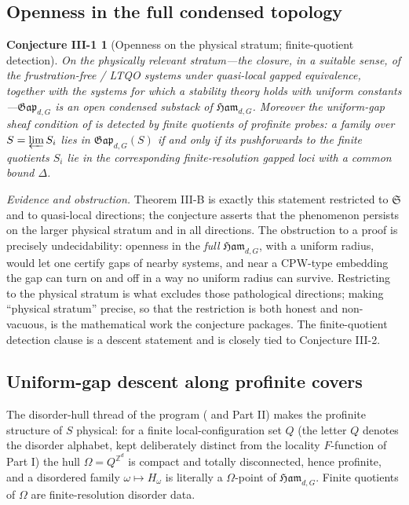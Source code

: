 \documentclass[12pt]{article}
\newcommand{\Ffun}{F}                          %
\newcommand{\Ham}{\mathfrak{Ham}}              %
\newcommand{\Gap}{\mathfrak{Gap}}              %
\newcommand{\gapbound}{\Delta}                  %
\newcommand{\dis}{\Omega}                       %
\newcommand{\Z}{\mathbb{Z}}
\theoremstyle{plain}
\newtheorem*{conjone}{Conjecture III-1}
\theoremstyle{definition}
\theoremstyle{remark}
\begin{document}
\subsection{Openness in the full condensed topology}
\label{sec:conj-open}

\begin{conjone}[Openness on the physical stratum; finite-quotient detection]
\label{conj:III1}
On the physically relevant stratum---the closure, in a suitable sense, of the
frustration-free / LTQO systems under quasi-local gapped equivalence, together with
the systems for which a stability theory holds with uniform constants---$\Gap_{d,G}$
is an \emph{open} condensed substack of $\Ham_{d,G}$. Moreover the uniform-gap sheaf
condition of  is detected by finite quotients of profinite probes: a
family over $S=\varprojlim S_i$ lies in $\Gap_{d,G}(S)$ if and only if its pushforwards
to the finite quotients $S_i$ lie in the corresponding finite-resolution gapped loci
with a common bound $\gapbound$.
\end{conjone}

\emph{Evidence and obstruction.} Theorem III-B is exactly this statement restricted to
$\mathfrak{S}$ and to quasi-local directions; the conjecture asserts that the phenomenon
persists on the larger physical stratum and in all directions. The obstruction to a
proof is precisely undecidability: openness in the \emph{full} $\Ham_{d,G}$, with a
uniform radius, would let one certify gaps of nearby systems, and near a CPW-type
embedding \cite{cpw-undecidable} the gap can turn on and off in a way no uniform radius
can survive. Restricting to the physical stratum is what excludes those pathological
directions; making ``physical stratum'' precise, so that the restriction is both
honest and non-vacuous, is the mathematical work the conjecture packages. The
finite-quotient detection clause is a descent statement and is closely tied to
Conjecture III-2.

\subsection{Uniform-gap descent along profinite covers}
\label{sec:conj-descent}

The disorder-hull thread of the program (\cite{bellissard-ncg-qhe,kellendonk-tilings}
and Part II) makes the profinite structure of $S$ physical: for a finite
local-configuration set $Q$ (the letter $Q$ denotes the disorder alphabet, kept
deliberately distinct from the locality $\Ffun$-function of Part I) the hull
$\dis=Q^{\Z^d}$ is compact and totally
disconnected, hence profinite, and a disordered family $\omega\mapsto H_\omega$ is
literally a $\dis$-point of $\Ham_{d,G}$. Finite quotients of $\dis$ are
finite-resolution disorder data.
\end{document}
